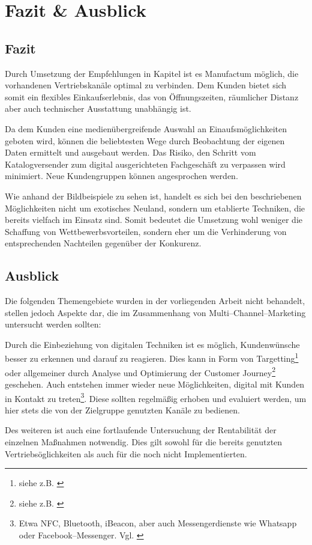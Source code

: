 \section{Fazit \& Ausblick}

\subsection{Fazit}

Durch Umsetzung der Empfehlungen in Kapitel  ist es Manufactum möglich, die vorhandenen Vertriebskanäle optimal zu verbinden. Dem Kunden bietet sich somit ein flexibles Einkaufserlebnis, das von Öffnungszeiten, räumlicher Distanz aber auch technischer Ausstattung unabhängig ist. 

Da dem Kunden eine medienübergreifende Auswahl an Einaufsmöglichkeiten geboten wird, können die beliebtesten Wege durch Beobachtung der eigenen Daten ermittelt und ausgebaut werden. Das Risiko, den Schritt vom Katalogversender zum digital ausgerichteten Fachgeschäft zu verpassen wird minimiert. Neue Kundengruppen können angesprochen werden.

Wie anhand der Bildbeispiele zu sehen ist, handelt es sich bei den beschriebenen Möglichkeiten nicht um exotisches Neuland, sondern um etablierte Techniken, die bereits vielfach im Einsatz sind. Somit bedeutet die Umsetzung wohl weniger die Schaffung von Wettbewerbsvorteilen, sondern eher um die Verhinderung von entsprechenden Nachteilen gegenüber der Konkurenz.

\subsection{Ausblick}

Die folgenden Themengebiete wurden in der vorliegenden Arbeit nicht behandelt, stellen jedoch Aspekte dar, die im Zusammenhang von Multi--Channel--Marketing untersucht werden sollten:

Durch die Einbeziehung von digitalen Techniken ist es möglich, Kundenwünsche besser zu erkennen und darauf zu reagieren. Dies kann in Form von Targetting\footnote{siehe z.B. \cite{omptarget}} oder allgemeiner durch Analyse und Optimierung der Customer Journey\footnote{siehe z.B. \cite{ompcj}} geschehen. Auch entstehen immer wieder neue Möglichkeiten, digital mit Kunden in Kontakt zu treten\footnote{Etwa NFC, Bluetooth, iBeacon, aber auch Messengerdienste wie Whatsapp oder Facebook--Messenger. Vgl. \cite{waidele}}. Diese sollten regelmäßig erhoben und evaluiert werden, um hier stets die von der Zielgruppe genutzten Kanäle zu bedienen.


Des weiteren ist auch eine fortlaufende Untersuchung der Rentabilität der einzelnen Maßnahmen notwendig. Dies gilt sowohl für die bereits genutzten Vertriebsöglichkeiten als auch für die noch nicht Implementierten.
